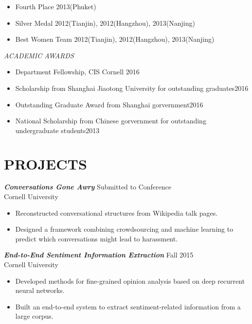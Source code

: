 \documentclass[margin, 10pt]{res} %
\begin{document}
\begin{resume}
\begin{itemize} \itemsep -2pt %
\item Fourth Place \hfill 2013(Phuket)
\item Silver Medal \hfill 2012(Tianjin), 2012(Hangzhou), 2013(Nanjing) 
\item Best Women Team \hfill 2012(Tianjin), 2012(Hangzhou), 2013(Nanjing) 
\end{itemize}

{\sl ACADEMIC AWARDS}
\begin{itemize}
\item Department Fellowship, CIS Cornell \hfill 2016
\item Scholarship from Shanghai Jiaotong University for outstanding graduates\hfill 2016
\item Outstanding Graduate Award from Shanghai gorvernment\hfill 2016
\item National Scholarship from Chinese gorvernment for outstanding undergraduate students\hfill 2013 
\end{itemize}

 
\section{PROJECTS}

{\sl \textbf{Conversations Gone Awry}} \hfill Submitted to Conference\\
Cornell University
\begin{itemize}
\item Reconstructed conversational structures from Wikipedia talk pages.
\item Designed a framework combining crowdsourcing and machine learning to predict which conversations might lead to harassment. 
\end{itemize}

{\sl \textbf{End-to-End Sentiment Information Extraction}} \hfill Fall 2015\\
Cornell University
\begin{itemize}
\item Developed methods for fine-grained opinion analysis based on deep recurrent neural networks.
\item Built an end-to-end system to extract sentiment-related information
  from a large corpus.
\end{itemize}


\end{resume}
\end{document}
